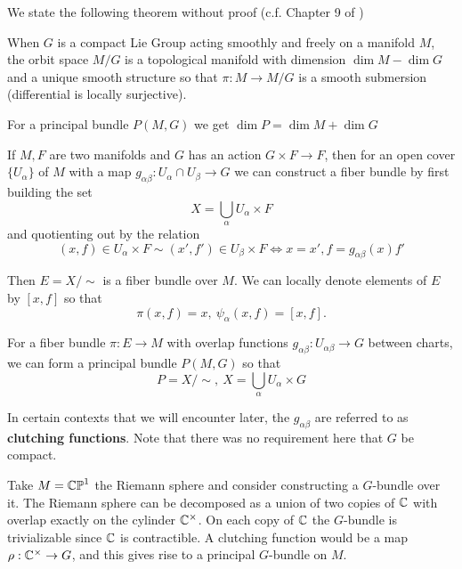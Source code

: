 		We state the following theorem without proof (c.f. Chapter 9 of \cite{lee2003})
		\begin{theorem}
			When $G$ is a compact Lie Group acting smoothly and freely on a manifold $M$, the orbit space $M/G$ is a topological manifold with dimension $\dim M - \dim G$ and a unique smooth structure so that $\pi: M \rightarrow M/G$ is a smooth submersion (differential is locally surjective). 
		\end{theorem}
		
		\begin{cor}
			For a principal bundle $P(M,G)$ we get $\dim P = \dim M + \dim G$
		\end{cor}
		
		If $M,F$ are two manifolds and $G$ has an action $G \times F \rightarrow F$, then for an open cover $\{ U_\alpha \}$ of $M$ with a map $g_{\alpha \beta}: U_{\alpha}\cap U_{\beta} \to G$ we can construct a fiber bundle by first building the set
		\begin{equation}
			X = \bigcup_\alpha U_\alpha \times F
		\end{equation} 
		and quotienting out by the relation
		\begin{equation}
			(x, f) \in U_\alpha \times F \sim (x', f') \in U_\beta \times F \Longleftrightarrow x=x', f=g_{\alpha \beta}(x) f' 
		\end{equation}
		
		Then $E = X/\sim$ is a fiber bundle over $M$. We can locally denote elements of $E$ by $[x,f]$ so that
		\begin{equation}
			\pi(x,f) = x, ~ \psi_\alpha(x,f) = [x,f].
		\end{equation}
		
		\begin{prop}
			For a fiber bundle $\pi: E \rightarrow M$ with overlap functions $g_{\alpha \beta}: U_{\alpha \beta} \rightarrow G$ between charts, we can form a principal bundle $P(M,G)$ so that 
			\begin{equation}
				P = X/\sim, ~ X = \bigcup_\alpha U_\alpha \times G
			\end{equation}
		\end{prop}
		In certain contexts that we will encounter later, the $g_{\alpha \beta}$ are referred to as \textbf{clutching functions}.
		Note that there was no requirement here that $G$ be compact. \\
		
		\begin{eg}
			Take $M = \mathbb{CP}^1$ the Riemann sphere and consider constructing a $G$-bundle over it. The Riemann sphere can be decomposed as a union of two copies of $\mathbb{C}$ with overlap exactly on the cylinder $\mathbb{C}^{\times}$. On each copy of $\mathbb{C}$ the $G$-bundle is trivializable since $\mathbb{C}$ is contractible. A clutching function would be a map $\rho: \mathbb{C}^\times \to G$, and this gives rise to a principal $G$-bundle on $M$. 
		\end{eg}
		
